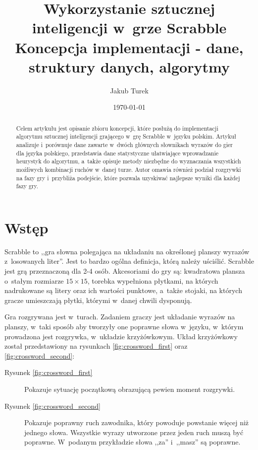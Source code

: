 \documentclass[a4paper,twocolumn,12pt]{article}
\title{\LARGE{Wykorzystanie sztucznej inteligencji w~grze Scrabble} \\ \vspace{2mm} \large{Koncepcja implementacji - dane, struktury danych, algorytmy}}
\author{Jakub Turek}
\date{\today}
\begin{document}
\maketitle

\begin{abstract}
Celem artykułu jest opisanie zbioru koncepcji, które posłużą do implementacji algorytmu sztucznej inteligencji grającego w~grę Scrabble w~języku polskim. Artykuł analizuje i~porównuje dane zawarte w~dwóch głównych słownikach wyrazów do gier dla języka polskiego, przedstawia dane statystyczne ułatwiające wprowadzanie heurystyk do algorytmu, a~także opisuje metody niezbędne do wyznaczania wszystkich możliwych kombinacji ruchów w~danej turze. Autor omawia również podział rozgrywki na fazy gry i~przybliża podejście, które pozwala uzyskiwać najlepsze wyniki dla każdej fazy gry.
\end{abstract}

\section*{Wstęp}

Scrabble to ,,gra słowna polegająca na układaniu na określonej planszy wyrazów z~losowanych liter''. \cite{scrabble_definition} Jest to bardzo ogólna definicja, którą należy uściślić. Scrabble jest grą przeznaczoną dla 2-4 osób. Akcesoriami do gry są: kwadratowa plansza o~stałym rozmiarze $15 \times 15$, torebka wypełniona płytkami, na których nadrukowane są litery oraz ich wartości punktowe, a~także stojaki, na których gracze umieszczają płytki, którymi w~danej chwili dysponują.

Gra rozgrywana jest w~turach. Zadaniem graczy jest układanie wyrazów na planszy, w~taki sposób aby tworzyły one poprawne słowa w~języku, w~którym prowadzona jest rozgrywka, w~układzie krzyżówkowym. Układ krzyżówkowy został przedstawiony na rysunkach \ref{fig:crossword_first} oraz \ref{fig:crossword_second}:

\begin{description}
 \item [Rysunek \ref{fig:crossword_first}] Pokazuje sytuację początkową obrazującą pewien moment rozgrywki.
 \item [Rysunek \ref{fig:crossword_second}] Pokazuje poprawny ruch zawodnika, który powoduje powstanie więcej niż jednego słowa. Wszystkie wyrazy utworzone przez jeden ruch muszą być poprawne. W~podanym przykładzie słowa ,,za'' i~,,masz'' są poprawne.
\end{description}
\end{document}
